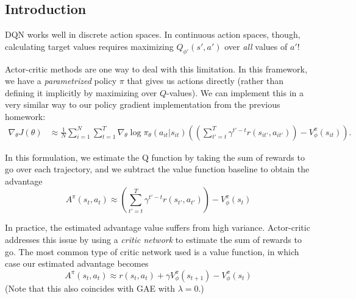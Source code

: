 \documentclass{article}
\begin{document}
\subsection{Introduction}

DQN works well in discrete action spaces. In continuous action spaces, though, calculating target values requires maximizing $Q_{\phi'}(s', a')$ over \textit{all} values of $a'$!

Actor-critic methods are one way to deal with this limitation. In this framework, we have a \textit{parametrized} policy $\pi$ that gives us actions directly (rather than defining it implicitly by maximizing over $Q$-values). We can implement this in a very similar way to our policy gradient implementation from the previous homework:
\begin{align*}
\nabla_\theta J(\theta) &\approx \frac{1}{N} \sum_{i=1}^N \sum_{t=1}^T \nabla_\theta \log \pi_\theta(a_{it} | s_{it})\left(\left(\sum_{t'=t}^T \gamma^{t'-t} r(s_{it'}, a_{it'})\right) - V_\phi^\pi\left(s_{it}\right)\right).
\end{align*}

In this formulation, we estimate the Q function by taking the sum of rewards to go over each trajectory, and we subtract the value function baseline to obtain the advantage $$A^\pi(s_{t}, a_{t}) \approx \left(\sum_{t'=t}^T \gamma^{t'-t} r(s_{t'}, a_{t'})\right) - V_\phi^\pi\left(s_{t}\right)$$

In practice, the estimated advantage value suffers from high variance. Actor-critic addresses this issue by using a \textit{critic network} to estimate the sum of rewards to go. The most common type of critic network used is a value function, in which case our estimated advantage becomes
$$A^\pi(s_{t}, a_{t}) \approx r(s_{t}, a_{t}) + \gamma V_\phi^\pi\left(s_{t+1}\right) - V_\phi^\pi\left(s_{t}\right)$$
(Note that this also coincides with GAE with $\lambda = 0$.)
\end{document}
